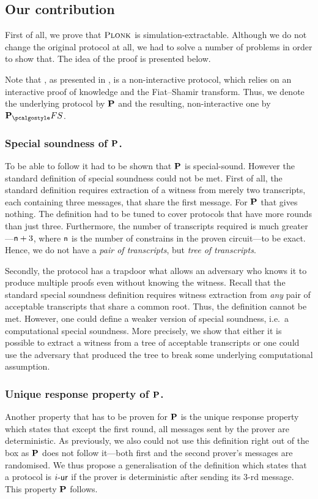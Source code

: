 \documentclass[runningheads,11pt]{llncs}
\theoremstyle{definition}
\begin{document}
\subsection{Our contribution}
First of all, we prove that $\textsc{Plonk}$ is simulation-extractable. Although we do not change the original protocol at all, we had to solve a number of problems in order to show that. The idea of the proof is presented below. 

Note that \plonk{}, as presented in \cite{EPRINT:GabWilCio19}, is a non-interactive protocol, which relies on an interactive proof of knowledge and the Fiat--Shamir transform. Thus, we denote the underlying protocol by $\mathbf{P}$ and the resulting, non-interactive one by $\plonkprot_\fs$. 

\subsubsection{Special soundness of $\mathbf{P}$.}
To be able to follow \cite{INDOCRYPT:FKMV12} it had to be shown that $\mathbf{P}$ is special-sound. However the standard definition of special soundness could not be met.
First of all, the standard definition requires extraction of a witness from merely two transcripts, each containing three messages, that share the first message. For $\mathbf{P}$ that gives nothing. The definition had to be tuned to cover protocols that have more rounds than just three. 
Furthermore, the number of transcripts required is much greater---$\mathsf{n} + 3$, where $\mathsf{n}$ is the number of constrains in the proven circuit---to be exact. Hence, we do not have a \emph{pair of transcripts}, but \emph{tree of transcripts}.

Secondly, the protocol has a trapdoor what allows an adversary who knows it to produce multiple proofs even without knowing the witness. Recall that the standard special soundness definition requires witness extraction from \emph{any} pair of acceptable transcripts that share a common root. Thus, the definition cannot be met. However, one could define a weaker version of special soundness, i.e.~a computational special soundness. More precisely, we show that either it is possible to extract a witness from a tree of acceptable transcripts or one could use the adversary that produced the tree to break some underlying computational assumption.

\subsubsection{Unique response property of $\mathbf{P}$.}
Another property that has to be proven for $\mathbf{P}$ is the unique response property \cite{C:Fischlin05} which states that except the first round, all messages sent by the prover are deterministic. As previously, we also could not use this definition right out of the box as $\mathbf{P}$ does not follow it---both first and the second prover's messages are randomised. We thus propose a generalisation of the definition which states that a protocol is ${i\text{-}\mathsf{ur}}$ if the prover is deterministic after sending its $3$-rd message. This property $\mathbf{P}$ follows.
\end{document}
